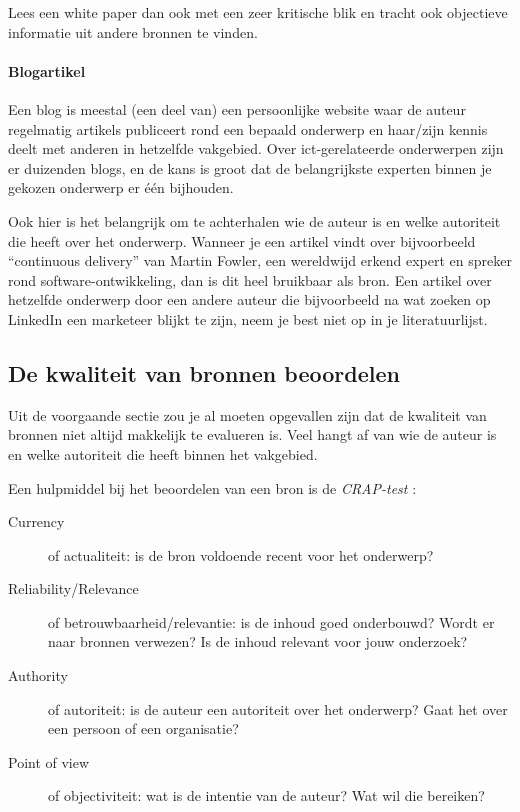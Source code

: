 Lees een white paper dan ook met een zeer kritische blik en tracht ook objectieve informatie uit andere bronnen te vinden.

\paragraph{Blogartikel}

Een blog is meestal (een deel van) een persoonlijke website waar de auteur regelmatig artikels publiceert rond een bepaald onderwerp en haar/zijn kennis deelt met anderen in hetzelfde vakgebied. Over ict-gerelateerde onderwerpen zijn er duizenden blogs, en de kans is groot dat de belangrijkste experten binnen je gekozen onderwerp er één bijhouden.

Ook hier is het belangrijk om te achterhalen wie de auteur is en welke autoriteit die heeft over het onderwerp. Wanneer je een artikel vindt over bijvoorbeeld ``continuous delivery'' van Martin Fowler, een wereldwijd erkend expert en spreker rond software-ontwikkeling, dan is dit heel bruikbaar als bron. Een artikel over hetzelfde onderwerp door een andere auteur die bijvoorbeeld na wat zoeken op LinkedIn een marketeer blijkt te zijn, neem je best niet op in je literatuurlijst.

\subsection{De kwaliteit van bronnen beoordelen}
\label{sub:de-kwaliteit-van-bronnen-beoordelen}

Uit de voorgaande sectie zou je al moeten opgevallen zijn dat de kwaliteit van bronnen niet altijd makkelijk te evalueren is. Veel hangt af van wie de auteur is en welke autoriteit die heeft binnen het vakgebied.

Een hulpmiddel bij het beoordelen van een bron is de \emph{CRAP-test} \autocite{Gratz2015}:

\begin{description}
  \item[Currency] of actualiteit: is de bron voldoende recent voor het onderwerp?
  \item[Reliability/Relevance] of betrouwbaarheid/relevantie: is de inhoud goed onderbouwd? Wordt er naar bronnen verwezen? Is de inhoud relevant voor jouw onderzoek?
  \item[Authority] of autoriteit: is de auteur een autoriteit over het onderwerp? Gaat het over een persoon of een organisatie?
  \item[Point of view] of objectiviteit: wat is de intentie van de auteur? Wat wil die bereiken?
\end{description}

